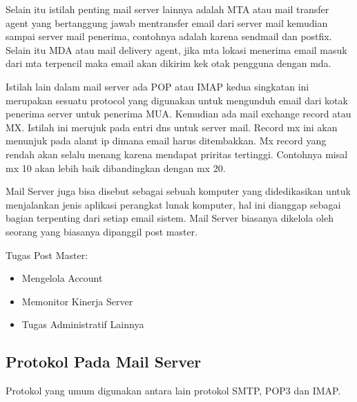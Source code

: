 	Selain itu istilah penting mail server lainnya adalah MTA atau mail transfer agent yang bertanggung jawab mentransfer email dari server mail kemudian sampai server mail penerima, contohnya adalah karena sendmail dan postfix. Selain itu MDA atau mail delivery agent, jika mta lokasi menerima email masuk dari mta terpencil maka email akan dikirim kek otak pengguna dengan mda.	\par \vspace{12pt}
	
	Istilah lain dalam mail server ada POP atau IMAP kedua singkatan ini merupakan sesuatu protocol yang digunakan untuk mengunduh email dari kotak penerima server untuk penerima MUA. Kemudian ada mail exchange record atau MX. Istilah ini merujuk pada entri dns untuk server mail. Record mx ini akan menunjuk pada alamt ip dimana email harus ditembakkan. Mx record yang rendah akan selalu menang karena mendapat priritas tertinggi. Contohnya misal mx 10 akan lebih baik dibandingkan dengan mx 20.	\par \vspace{12pt}
	
	Mail Server juga bisa disebut sebagai sebuah komputer yang didedikasikan untuk menjalankan jenis aplikasi perangkat lunak komputer, hal ini dianggap sebagai bagian terpenting dari setiap email sistem. Mail Server biasanya dikelola oleh seorang yang biasanya dipanggil post master.
 
	Tugas Post Master:
	\begin{itemize}
		\item Mengelola Account  
		\item Memonitor Kinerja Server 
		\item Tugas Administratif Lainnya
	\end{itemize}

\subsection {Protokol Pada Mail Server}
	Protokol yang umum digunakan antara lain protokol SMTP, POP3 dan IMAP.
	
